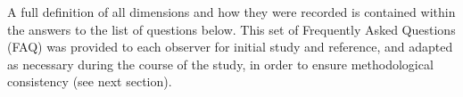 \documentclass[12pt]{article}
\begin{document}
A full definition of all dimensions and how they were recorded is contained within the answers to the list of questions below. This set of Frequently Asked Questions (FAQ) was provided to each observer for initial study and reference, and adapted as necessary during the course of the study, in order to ensure methodological consistency (see next section).  



\end{document}
